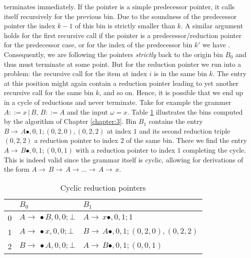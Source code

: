 \begin{isabellebody}
\begin{isamarkuptext}
terminates immediately. If the pointer is a simple predecessor pointer, it calls itself recursively
for the previous bin. Due to the soundness of the predecessor pointer the index $k-1$ of this bin
is strictly smaller than $k$. A similar argument holds for the first recursive call if the pointer
is a predecessor/reduction pointer for the predecessor case, or for the index of the predecessor bin $k'$ we have . Consequently, we are following
the pointers \textit{strictly} back to the origin bin $B_0$ and thus must terminate at some point. But for
the reduction pointer  we run into a problem: the recursive call for the item at index $i$ is in the same
bin $k$. The entry at this position might again contain a reduction pointer  leading to yet another recursive call
for the same bin $k$, and so on.
Hence, it is possible that we end up in a cycle of reductions and never terminate. Take for example the
grammer $A ::= x \, | \, B, \, B ::= A$ and the input $\omega = x$. Table \ref{tab:cyclic-pointers}
illustrates the bins computed by the algorithm of Chapter \ref{chapter:3}. Bin $B_1$ contains the entry
$B \rightarrow \, A \bullet, 0, 1; (0, 2, 0),(0, 2, 2)$ at index $1$ and its second reduction triple
$(0, 2, 2)$ a reduction pointer to index $2$ of the same bin. There we find the entry
$A \rightarrow \, B \bullet, 0, 1; (0, 0, 1)$ with a reduction pointer to index $1$ completing the
cycle. This is indeed valid since the grammar itself is cyclic, allowing for derivations of the form
$A \rightarrow \, B \rightarrow \, A \rightarrow \dots \rightarrow \, A \rightarrow \, x$.

  \begin{table}[htpb]
    \caption[Cyclic reduction pointers]{Cyclic reduction pointers} \label{tab:cyclic-pointers}
    \centering
    \begin{tabular}{| l | l | l |}
          & $B_0$                                     & $B_1$ \\
      \midrule
        0 & $A \rightarrow \, \bullet B, 0, 0; \bot$  & $A \rightarrow \, x \bullet, 0, 1; 1$ \\
        1 & $A \rightarrow \, \bullet x, 0, 0; \bot$  & $B \rightarrow \, A \bullet, 0, 1; (0, 2, 0),(0, 2, 2)$ \\
        2 & $B \rightarrow \, \bullet A, 0, 0; \bot$  & $A \rightarrow \, B \bullet, 0, 1; (0, 0, 1)$ \\
    \end{tabular}
  \end{table}


\end{isamarkuptext}
\end{isabellebody}
